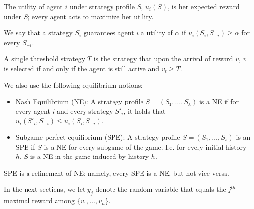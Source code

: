 The utility of agent $i$ under strategy profile $S$, $u_i(S)$, is her expected reward under $S$; every agent acts to maximize her utility.

We say that a strategy $S_i$ guarantees agent $i$ a utility of $\alpha$ if $u_i(S_i,S_{-i}) \geq \alpha$ for every $S_{-i}$. 

\begin{definition}
A single threshold strategy $T$ is the strategy that upon the arrival of reward $v$, $v$ is selected if and only if the agent is still active and $v_t \geq T$.
\end{definition}

We also use the following equilibrium notions:

\begin{itemize}
	\item Nash Equilibrium (NE): A strategy profile $S=(S_1,\ldots, S_k)$ is a NE if for every agent $i$ and every strategy $S'_i$, it holds that $u_i(S'_i,S_{-i}) \leq u_i(S_i,S_{-i})$.
	
	\item Subgame perfect equilibrium (SPE): A strategy profile $S=(S_1,\ldots, S_k)$ is an SPE if $S$ is a NE for every subgame of the game. I.e. for every initial history $h$, $S$ is a NE in the game induced by history $h$. 
\end{itemize}

SPE is a refinement of NE; namely, every SPE is a NE, but not vice versa.

In the next sections, we let $y_j$ denote the random variable that equals the $j^{th}$ maximal reward among $\{v_1,\ldots,v_n\}$. 





